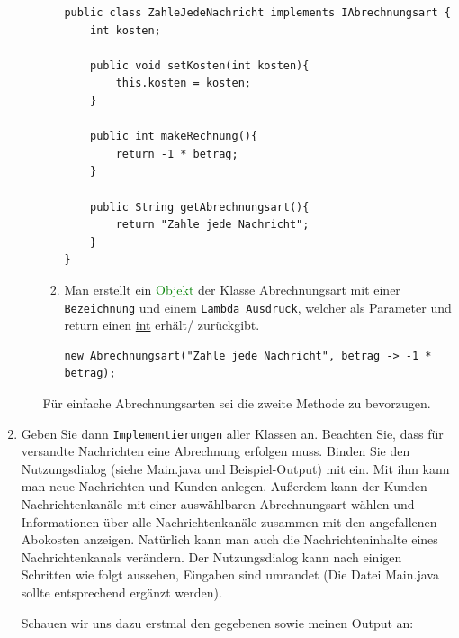 \documentclass{article}
\newcommand{\gqq}[1]{\glqq{}#1\grqq{}}
\begin{document}
\begin{enumerate}[label=\alph*.]
\begin{itemize}
\begin{enumerate}[label=\arabic*.]
                        \begin{verbatim}
public class ZahleJedeNachricht implements IAbrechnungsart {
    int kosten;

    public void setKosten(int kosten){
        this.kosten = kosten;
    }

    public int makeRechnung(){
        return -1 * betrag;
    }

    public String getAbrechnungsart(){
        return "Zahle jede Nachricht";
    }
}
                        \end{verbatim}

                        \item Man erstellt ein \textcolor{green}{Objekt} der Klasse \gqq{Abrechnungsart} mit einer \texttt{Bezeichnung} und einem \texttt{Lambda Ausdruck}, welcher als Parameter und return einen \underline{int} erhält/ zurückgibt.

                            \begin{verbatim}
new Abrechnungsart("Zahle jede Nachricht", betrag -> -1 * betrag);
                            \end{verbatim}
                    \end{enumerate}

                    Für \gqq{einfache} Abrechnungsarten sei die zweite Methode zu bevorzugen.
            \end{itemize}
            
        \newpage
        \item Geben Sie dann \texttt{Implementierungen} aller Klassen an.
        Beachten Sie, dass für versandte Nachrichten eine Abrechnung erfolgen muss.
        Binden Sie den Nutzungsdialog (siehe Main.java und Beispiel-Output) mit ein.
        Mit ihm kann man neue Nachrichten und Kunden anlegen.
        Außerdem kann der Kunden Nachrichtenkanäle mit einer auswählbaren Abrechnungsart wählen und Informationen über alle Nachrichtenkanäle zusammen mit den angefallenen Abokosten anzeigen.
        Natürlich kann man auch die Nachrichteninhalte eines Nachrichtenkanals verändern. Der Nutzungsdialog kann nach einigen Schritten wie folgt aussehen, Eingaben sind umrandet (Die Datei Main.java sollte entsprechend ergänzt werden). 

        Schauen wir uns dazu erstmal den gegebenen sowie meinen Output an:


\end{enumerate}
\end{document}
